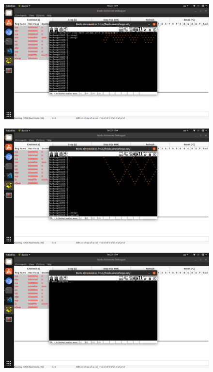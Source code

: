 \documentclass[a4paper,11pt,UTF8]{ctexart}
\newcommand{\bottomcaption}{%
\setlength{\abovecaptionskip}{6pt}%
\setlength{\belowcaptionskip}{6pt}%
\caption}
\newcommand{\xiaowuhao}{\fontsize{9pt}{\baselineskip}\selectfont}   %
\begin{document}
  \begin{figure}[!htbp]
    \centering
    \includegraphics[width=\textwidth]{imgs/Screenshot_from_2019-03-29_21-11-20.png}
    \bottomcaption{\xiaowuhao{Shot3}}
  \end{figure}
  \begin{figure}[!htbp]
    \centering
    \includegraphics[width=\textwidth]{imgs/Screenshot_from_2019-03-29_21-11-39.png}
    \bottomcaption{\xiaowuhao{Shot3}}
  \end{figure}
  \begin{figure}[!htbp]
    \centering
    \includegraphics[width=\textwidth]{imgs/Screenshot_from_2019-03-29_21-11-51.png}
    \bottomcaption{\xiaowuhao{Shot3}}
  \end{figure}
\end{document}
